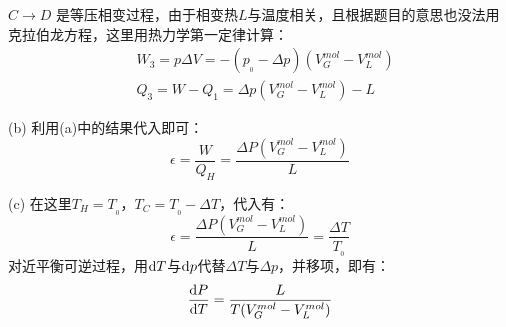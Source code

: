 \begin{solution}
        $C\rightarrow D$ 是等压相变过程，由于相变热$L$与温度相关，且根据题目的意思也没法用克拉伯龙方程，这里用热力学第一定律计算：
        \begin{equation*}
            \begin{aligned}
                &W_3 = p\Delta V = -(p_{_0} - \Delta p)(V_{G}^{mol}-V_{L}^{mol})\\
                &Q_3 = W - Q_1 = \Delta p(V_{G}^{mol}-V_{L}^{mol}) - L
            \end{aligned}
        \end{equation*}
        
        (b) 利用(a)中的结果代入即可：
        \begin{equation*}
            \epsilon = \frac{W}{Q_H} = \frac{\Delta P(V_{G}^{mol}-V_{L}^{mol})}{L}
        \end{equation*}

        (c) 在这里$T_H = T_{_0}$，$T_C =T_{_0} - \Delta T$，代入有：
        \begin{equation*}
            \epsilon = \frac{\Delta P(V_{G}^{mol}-V_{L}^{mol})}{L} = \frac{\Delta T}{T_{_0}}
        \end{equation*}
        对近平衡可逆过程，用$\mathrm{d} T$与$\mathrm{d} p$代替$\Delta T$与$\Delta p$，并移项，即有：
        \begin{equation*}
            \frac{\mathrm{d}{P}}{\mathrm{d}{T}}=\frac{L}{T(V_{G}^{mol}-V_{L}^{mol})}
        \end{equation*}
    \end{solution}
